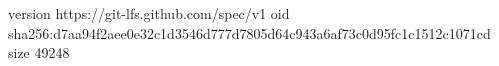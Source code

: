 version https://git-lfs.github.com/spec/v1
oid sha256:d7aa94f2aee0e32c1d3546d777d7805d64c943a6af73c0d95fc1c1512c1071cd
size 49248
